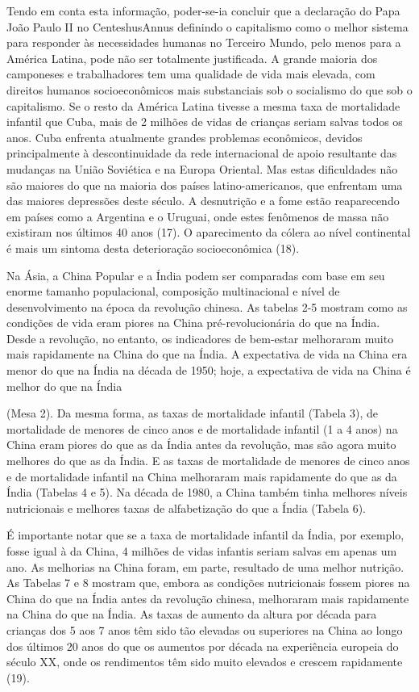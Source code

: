 \documentclass[twocolumn,amsmath,amssymb,aps,pre,floatfix]{revtex4-2}
\begin{document}
\par
Tendo em conta esta informação, poder-se-ia concluir que a declaração do Papa João Paulo II no CenteshusAnnus definindo o capitalismo como o melhor sistema para responder às necessidades humanas no Terceiro Mundo, pelo menos para a América Latina, pode não ser totalmente justificada. A grande maioria dos camponeses e trabalhadores tem uma qualidade de vida mais elevada, com direitos humanos socioeconômicos mais substanciais sob o socialismo do que sob o capitalismo. Se o resto da América Latina tivesse a mesma taxa de mortalidade infantil que Cuba, mais de 2 milhões de vidas de crianças seriam salvas todos os anos. Cuba enfrenta atualmente grandes problemas econômicos, devidos principalmente à descontinuidade da rede internacional de apoio resultante das mudanças na União Soviética e na Europa Oriental. Mas estas dificuldades não são maiores do que na maioria dos países latino-americanos, que enfrentam uma das maiores depressões deste século. A desnutrição e a fome estão reaparecendo em países como a Argentina e o Uruguai, onde estes fenômenos de massa não existiram nos últimos 40 anos (17). O aparecimento da cólera ao nível continental é mais um sintoma desta deterioração socioeconômica (18).
\par
Na Ásia, a China Popular e a Índia podem ser comparadas com base em seu enorme tamanho populacional, composição multinacional e nível de desenvolvimento na época da revolução chinesa. As tabelas 2-5 mostram como as condições de vida eram piores na China pré-revolucionária do que na Índia. Desde a revolução, no entanto, os indicadores de bem-estar melhoraram muito mais rapidamente na China do que na Índia. A expectativa de vida na China era menor do que na Índia na década de 1950; hoje, a expectativa de vida na China é melhor do que na Índia
\par
(Mesa 2). Da mesma forma, as taxas de mortalidade infantil (Tabela 3), de mortalidade de menores de cinco anos e de mortalidade infantil (1 a 4 anos) na China eram piores do que as da Índia antes da revolução, mas são agora muito melhores do que as da Índia. E as taxas de mortalidade de menores de cinco anos e de mortalidade infantil na China melhoraram mais rapidamente do que as da Índia (Tabelas 4 e 5). Na década de 1980, a China também tinha melhores níveis nutricionais e melhores taxas de alfabetização do que a Índia (Tabela 6).
\par
É importante notar que se a taxa de mortalidade infantil da Índia, por exemplo, fosse igual à da China, 4 milhões de vidas infantis seriam salvas em apenas um ano. As melhorias na China foram, em parte, resultado de uma melhor nutrição. As Tabelas 7 e 8 mostram que, embora as condições nutricionais fossem piores na China do que na Índia antes da revolução chinesa, melhoraram mais rapidamente na China do que na Índia. As taxas de aumento da altura por década para crianças dos 5 aos 7 anos têm sido tão elevadas ou superiores na China ao longo dos últimos 20 anos do que os aumentos por década na experiência europeia do século XX, onde os rendimentos têm sido muito elevados e crescem rapidamente (19).
\end{document}

